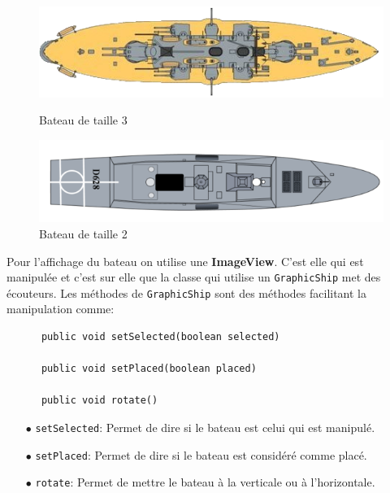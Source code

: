 \documentclass[12pt]{article}
\begin{document}
\begin{figure}[H]
      \includegraphics[width=\linewidth]{images/image BN V2/ship3.png}
      \caption{Bateau de taille 3}
      \endminipage\hfill
      \includegraphics[width=\linewidth]{images/image BN V2/ship2.png}
      \caption{Bateau de taille 2}
      \endminipage\hfill
\end{figure}

\bigskip

Pour l'affichage du bateau on utilise une \textbf{ImageView}. C'est elle qui
est manipulée et c'est sur elle que la classe qui utilise un
\texttt{GraphicShip} met des écouteurs. Les méthodes de \texttt{GraphicShip}
sont des méthodes facilitant la manipulation comme:
\begin{verbatim}
      public void setSelected(boolean selected)

      public void setPlaced(boolean placed)

      public void rotate()
\end{verbatim}
\begin{itemize}
      \item[$\bullet$]\texttt{setSelected}: Permet de dire si le bateau est
      celui qui est manipulé.
      \item[$\bullet$]\texttt{setPlaced}: Permet de dire si le bateau est
      considéré comme placé.
      \item[$\bullet$]\texttt{rotate}: Permet de mettre le bateau à la
      verticale ou à l'horizontale.
\end{itemize}

\bigskip
\end{document}
